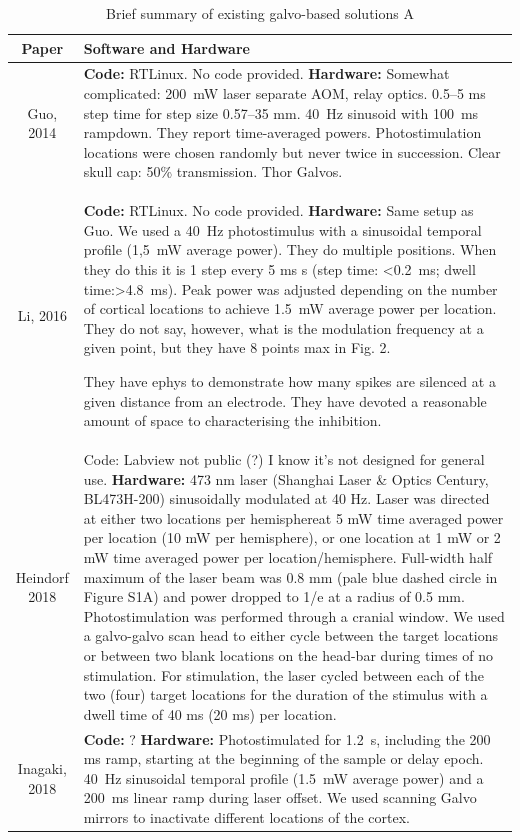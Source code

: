 
\begin{table}[h]
    \centering
    \begin{tabular}{c|p{100mm}}
        Paper & Software and Hardware  \\
    \hline
    
    Guo, 2014 & \textbf{Code:} RTLinux. No code provided. \textbf{Hardware:} Somewhat complicated: 200~mW laser separate AOM, relay optics. 0.5–5 ms step time for step size 0.57–35 mm. 40~Hz sinusoid with 100~ms rampdown. They report time-averaged powers.  Photostimulation locations were chosen randomly but never twice in succession. Clear skull cap: 50\% transmission. Thor Galvos.\\ 

    Li, 2016 & \textbf{Code:} RTLinux. No code provided. \textbf{Hardware:} Same setup as Guo. We used a 40~Hz photostimulus with a sinusoidal temporal profile (1,5~mW average power). They do multiple positions. When they do this it is 1 step every 5 ms s (step time: <0.2~ms; dwell time:>4.8~ms). Peak power was adjusted depending on the number of cortical locations to achieve 1.5~mW average power per location. They do not say, however, what is the modulation frequency at a given point, but they have 8 points max in Fig. 2. 
    
    They have ephys to demonstrate how many spikes are silenced at a given distance from an electrode. They have devoted a reasonable amount of space to characterising the inhibition.\\ 
    
    Heindorf 2018 & Code: Labview not public (?) I know it's not designed for general use. \textbf{Hardware:} 473 nm laser (Shanghai Laser \& Optics Century, BL473H-200) sinusoidally modulated at 40 Hz. Laser was directed at either two locations per hemisphereat 5 mW time averaged power per location (10 mW per hemisphere), or one location at 1 mW or 2 mW time averaged power per location/hemisphere. Full-width half maximum of the laser beam was 0.8 mm (pale blue dashed circle in Figure S1A) and power dropped to 1/e at a radius of 0.5 mm. Photostimulation was performed through a cranial window. We used a galvo-galvo scan head to either cycle between the target locations or between two blank locations on the head-bar during times of no stimulation. For stimulation, the laser cycled between each of the two (four) target locations for the duration of the stimulus with a dwell time of 40 ms (20 ms) per location.\\ 
    
    Inagaki, 2018  & \textbf{Code:} ? \textbf{Hardware:}  Photostimulated for 1.2~s, including the 200 ms ramp, starting at the beginning of the sample or delay epoch. 40~Hz sinusoidal temporal profile (1.5~mW average power) and a 200~ms linear ramp during laser offset. We used scanning Galvo mirrors to inactivate different locations of the cortex.\\

    \hline
    \end{tabular}
    \caption{Brief summary of existing galvo-based solutions A}
    \label{tab:system_summary A}
\end{table}


